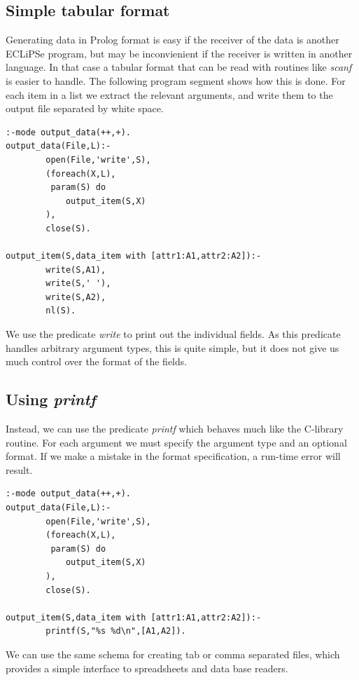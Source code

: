 \documentclass[a4paper,12pt]{report}
\begin{document}
\subsection{Simple tabular format}
Generating data in Prolog format is easy if the receiver of the data is another ECLiPSe program, but may be inconvienient if the receiver is written in another language. In that case a tabular format that can be read with routines like {\it scanf} is easier to handle. The following program segment shows how this is done. For each item in a list we extract the relevant arguments, and write them to the output file separated by white space.
\begin{verbatim}
:-mode output_data(++,+).
output_data(File,L):-
        open(File,'write',S),
        (foreach(X,L),
         param(S) do
            output_item(S,X)
        ),
        close(S).

output_item(S,data_item with [attr1:A1,attr2:A2]):-
        write(S,A1),
        write(S,' '),
        write(S,A2),
        nl(S).
\end{verbatim}
We use the predicate {\it write} to print out the individual fields. As this predicate handles arbitrary argument types, this is quite simple, but it does not give us much control over the format of the fields.

\subsection{Using {\it printf}}
Instead, we can use the predicate {\it printf} which behaves much like the C-library routine. For each argument we must specify the argument type and an optional format. If we make a mistake in the format specification, a run-time error will result.
\begin{verbatim}
:-mode output_data(++,+).
output_data(File,L):-
        open(File,'write',S),
        (foreach(X,L),
         param(S) do
            output_item(S,X)
        ),
        close(S).

output_item(S,data_item with [attr1:A1,attr2:A2]):-
        printf(S,"%s %d\n",[A1,A2]).
\end{verbatim}
We can use the same schema for creating tab or comma separated files, which provides a simple interface to spreadsheets and data base readers.
\end{document}
